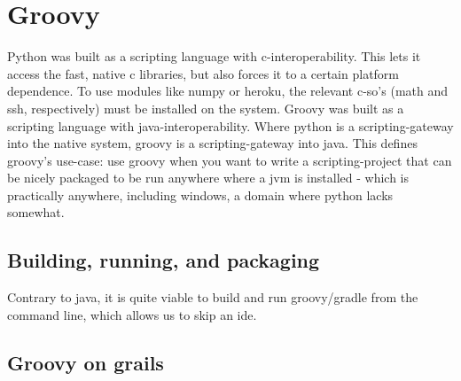 \section{Groovy}
Python was built as a scripting language with c-interoperability. This lets it access the fast, native c libraries, but also forces it to a certain platform dependence. To use modules like numpy or heroku, the relevant c-so's (math and ssh, respectively) must be installed on the system. 
Groovy was built as a scripting language with java-interoperability. Where python is a scripting-gateway into the native system, groovy is a scripting-gateway into java. This defines groovy's use-case: use groovy when you want to write a scripting-project that can be nicely packaged to be run anywhere where a jvm is installed - which is practically anywhere, including windows, a domain where python lacks somewhat. 

\subsection{Building, running, and packaging}
Contrary to java, it is quite viable to build and run groovy/gradle from the command line, which allows us to skip an ide. 

\subsection{Groovy on grails}
